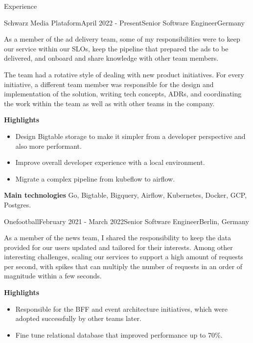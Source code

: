 \documentclass[
	a4paper, %
	10pt, %
]{resume} %
\begin{document}
\begin{rSection}{Experience}

	\begin{rSubsection}{Schwarz Media Plataform}{April 2022 - Present}{Senior Software Engineer}{Germany}
		\item[]
		As a member of the ad delivery team, some of my responsibilities were to keep our service within our SLOs, keep the pipeline that prepared the ads to be delivered,
		and onboard and share knowledge with other team members.

		The team had a rotative style of dealing with new product initiatives. For every initiative, a different team member was responsible for the design and implementation of the solution,
		writing tech concepts, ADRs, and coordinating the work within the team as well as with other teams in the company.

		\textbf{Highlights}
		\begin{itemize}
			\item Design Bigtable storage to make it simpler from a developer perspective and also more performant.
			\item Improve overall developer experience with a local environment.
			\item Migrate a complex pipeline from kubeflow to airflow.
		\end{itemize}

		\textbf{Main technologies}
			Go, Bigtable, Bigquery, Airflow, Kubernetes, Docker, GCP, Postgres.

	\end{rSubsection}

	\vspace{1mm}

	\begin{rSubsection}{Onefootball}{February 2021 - March 2022}{Senior Software Engineer}{Berlin, Germany}
		\item[]
		As a member of the news team, I shared the responsibility to keep the data provided for our users updated and tailored for their interests.
		Among other interesting challenges, scaling our services to support a high amount of requests per second, with spikes that can multiply the number of requests in an order of magnitude within a few seconds.

		\textbf{Highlights}
		\begin{itemize}
			\item Responsible for the BFF and event architecture initiatives, which were adopted successfully by other teams later.
			\item Fine tune relational database that improved performance up to 70\%.
		\end{itemize}


\end{rSubsection}
\end{rSection}
\end{document}
